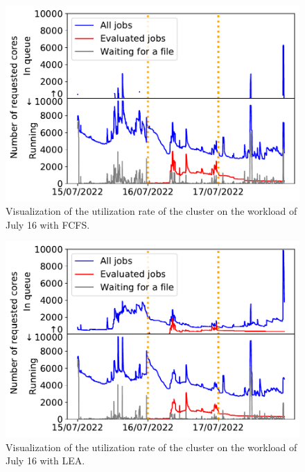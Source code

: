 \documentclass[conference,10pt]{IEEEtran}
\begin{document}
\begin{figure}[t]\centering\includegraphics[width=1\linewidth]{../MBSS/plot/Cluster_usage/2022-07-16->2022-07-16_V10000_Fcfs_Used_nodes_Reduced_450_128_32_256_4_1024_core_by_core.pdf}\caption{Visualization of the utilization rate of the cluster on the workload of July 16 with FCFS.}\label{07_16_cluster_usage_fcfs}\end{figure}
\begin{figure}[t]\centering\includegraphics[width=1\linewidth]{../MBSS/plot/Cluster_usage/2022-07-16->2022-07-16_V10000_Fcfs_with_a_score_x500_x1_x0_x0_Used_nodes_Reduced_450_128_32_256_4_1024_core_by_core.pdf}\caption{Visualization of the utilization rate of the cluster on the workload of July 16 with LEA.}\label{07_16_cluster_usage_lea}\end{figure}
\end{document}
